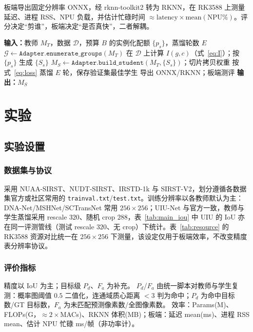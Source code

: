 \documentclass[lettersize,journal]{IEEEtran}
\begin{document}
板端导出固定分辨率 ONNX，经 rknn-toolkit2 转为 RKNN，在 RK3588 上测量延迟、进程 RSS、NPU 负载，并估计忙碌时间 $\approx\mathrm{latency}\times\mathrm{mean(NPU\%)}$。评分决定“剪谁”，板端决定“是否真快”，二者解耦。

\begin{algorithm}[!t]
\caption{可迁移 IRSTD 压缩协议}
\label{alg:main}
\begin{algorithmic}
\STATE \textbf{输入：}教师 $M_T$，数据 $\mathcal{D}$，预算 $B$ 的实例化配额 $\{p_s\}$，蒸馏轮数 $E$
\STATE $\mathcal{G}\leftarrow \texttt{Adapter.enumerate\_groups}(M_T)$
\STATE 在 $\mathcal{D}$ 上计算 $I(g,c)$（式~\eqref{eq:I}）；按 $\{p_s\}$ 生成 $\{S_s\}$
\STATE $M_S\leftarrow \texttt{Adapter.build\_student}(M_T,\{S_s\})$；切片拷贝权重
\STATE 按式~\eqref{eq:loss} 蒸馏 $E$ 轮，保存验证集最佳学生
\STATE 导出 ONNX/RKNN；板端测评
\STATE \textbf{输出：}$M_S$
\end{algorithmic}
\end{algorithm}

\section{实验}
\label{sec:exp}

\subsection{实验设置}
\label{sec:setup}

\subsubsection{数据集与协议}
采用 NUAA-SIRST、NUDT-SIRST、IRSTD-1k 与 SIRST-V2，划分遵循各数据集官方或社区常用的 \texttt{trainval.txt}/\texttt{test.txt}。训练分辨率以各教师默认为主：DNA-Net/MSHNet/SCTransNet 常用 $256\times256$；UIU-Net 与官方一致，教师与学生蒸馏采用 rescale $320$、随机 crop $288$，表~\ref{tab:main_iou} 中 UIU 的 IoU 亦在同一评测管线（测试 rescale $320$、无 crop）下统计。表~\ref{tab:resource} 的 RK3588 资源对比统一在 $256\times256$ 下测量，该设定仅用于板端效率，不改变精度表分辨率协议。

\subsubsection{评价指标}
精度以 IoU 为主；目标级 $P_d$、$F_a$ 为补充。
$P_d$/$F_a$ 由统一脚本对教师与学生复测：概率图阈值 $0.5$ 二值化，连通域质心距离 $<3$ 判为命中；$P_d$ 为命中目标数/GT 目标数，$F_a$ 为未匹配预测像素数/全图像素数。
效率：Params(M)、FLOPs(G，$\approx 2\times$MACs)、RKNN 体积(MB)；板端：延迟 mean(ms)、进程 RSS mean、估计 NPU 忙碌 ms/帧（非功率计）。
\end{document}
